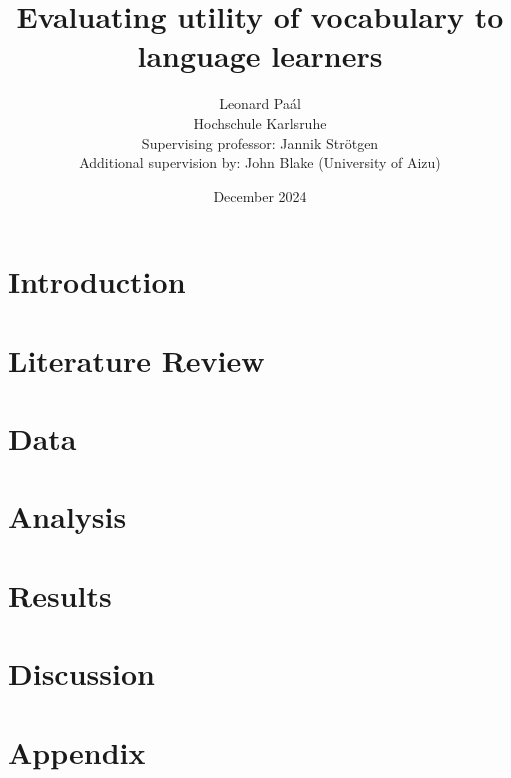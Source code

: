 \documentclass[12pt]{report}
\title{Evaluating utility of vocabulary to language learners}
\author{Leonard Paál\\Hochschule Karlsruhe\\Supervising professor: Jannik Strötgen\\Additional supervision by: John Blake (University of Aizu)}
\date{December 2024}
\begin{document}
\maketitle
\begin{abstract}
	\noindent [Abstract]
\end{abstract}

\clearpage
\tableofcontents
\listoffigures
\listoftables
\clearpage

\chapter{Introduction}

\chapter{Literature Review}

\chapter{Data}

\chapter{Analysis}

\chapter{Results}

\chapter{Discussion}


\chapter{Appendix}




\end{document}
